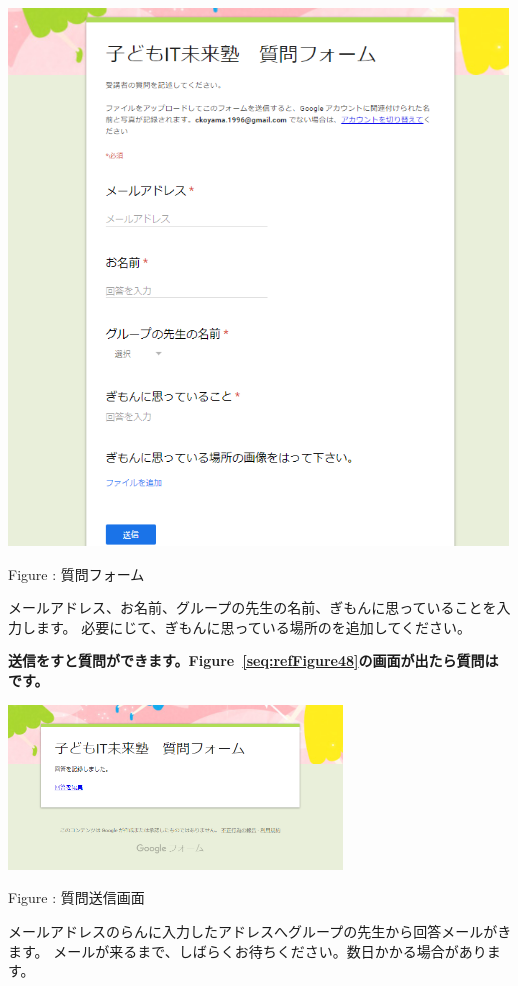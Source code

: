 \documentclass[a4paper,12pt]{jarticle}
\begin{document}
\centering
\begin{minipage}{11.915cm}
  {\upshape
    \includegraphics[width=13.263cm,height=14.233cm]{textbook-img246.png}
    \flushleft

    \bigskip
    Figure {\theFigure\label{seq:refFigure47}}: 質問フォーム}
\end{minipage}
\flushleft

\bigskip

メールアドレス、お名前、グループの先生の名前、ぎもんに思っていることを入力します。
必要にじて、ぎもんに思っている場所のを追加してください。

{\bfseries
送信\textmd{をすと質問ができます。Figure~\ref{seq:refFigure48}の画面が出たら質問はです。}}



\centering
\begin{minipage}{8.871cm}
  {\upshape
    \includegraphics[width=8.871cm,height=4.374cm]{textbook-img247.png}
    \flushleft

    \bigskip
    Figure {\theFigure\label{seq:refFigure48}}: 質問送信画面}
\end{minipage}
\flushleft
メールアドレスのらんに入力したアドレスへグループの先生から回答メールがきます。
メールが来るまで、しばらくお待ちください。数日かかる場合があります。
\end{document}
